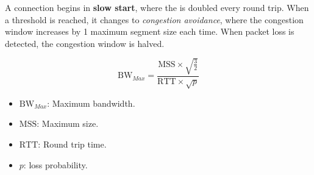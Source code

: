 A  connection begins in \textbf{slow start}, where the  is doubled every round trip.
When a threshold is reached, it changes to \emph{congestion avoidance}, where the congestion window increases by 1 maximum segment size each time.
When packet loss is detected, the congestion window is halved.

\begin{equation}\label{eq:TCP_Maximum_Bandwidth}
  \mathrm{BW}_{Max} = \frac{\mathrm{MSS} \times \sqrt{\frac{3}{2}}}{\mathrm{RTT} \times \sqrt{p}}
\end{equation}
\begin{itemize}[noitemsep]
\item $\mathrm{BW}_{Max}$: Maximum bandwidth.
\item $\mathrm{MSS}$: Maximum   size.
\item $\mathrm{RTT}$: Round trip time.
\item $p$:  loss probability.
\end{itemize}

